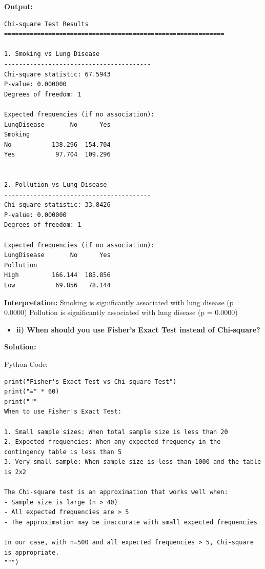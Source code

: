 \documentclass[12pt]{article}
\begin{document}
\textbf{Output:}

\vspace{0.3cm}

\begin{verbatim}
Chi-square Test Results
============================================================

1. Smoking vs Lung Disease
----------------------------------------
Chi-square statistic: 67.5943
P-value: 0.000000
Degrees of freedom: 1

Expected frequencies (if no association):
LungDisease       No      Yes
Smoking                      
No           138.296  154.704
Yes           97.704  109.296


2. Pollution vs Lung Disease
----------------------------------------
Chi-square statistic: 33.8426
P-value: 0.000000
Degrees of freedom: 1

Expected frequencies (if no association):
LungDisease       No      Yes
Pollution                    
High         166.144  185.856
Low           69.856   78.144
\end{verbatim}

\vspace{0.4cm}

\textbf{Interpretation:}
Smoking is significantly associated with lung disease (p = 0.0000)
Pollution is significantly associated with lung disease (p = 0.0000)


\vspace{0.4cm}

\begin{itemize}
    \item\textbf{ii) When should you use Fisher’s Exact Test instead of Chi‑square?}
\end{itemize}

{\large\textbf{Solution:}}

\vspace{0.1cm}

{\large{Python Code:}}

\vspace{0.2cm}
\begin{verbatim}
print("Fisher's Exact Test vs Chi-square Test")
print("=" * 60)
print("""
When to use Fisher's Exact Test:

1. Small sample sizes: When total sample size is less than 20
2. Expected frequencies: When any expected frequency in the contingency table is less than 5
3. Very small sample: When sample size is less than 1000 and the table is 2x2

The Chi-square test is an approximation that works well when:
- Sample size is large (n > 40)
- All expected frequencies are > 5
- The approximation may be inaccurate with small expected frequencies

In our case, with n=500 and all expected frequencies > 5, Chi-square is appropriate.
""")
\end{verbatim}
\vspace{0.3cm}
\end{document}
